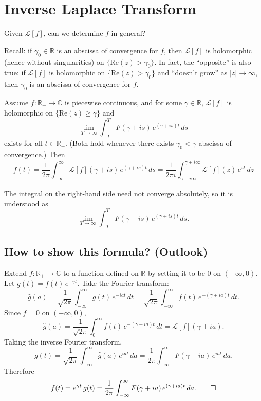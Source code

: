 
\newpage


\section{Inverse Laplace Transform}

Given $\mathcal{L}[f]$, can we determine $f$ in general?

Recall: if $\gamma_0 \in \mathbb{R}$ is an abscissa of convergence for $f$, then $\mathcal{L}[f]$ is holomorphic (hence without singularities) on $\{\mathrm{Re}(z) > \gamma_0\}$. In fact, the ``opposite'' is also true: if $\mathcal{L}[f]$ is holomorphic on $\{\mathrm{Re}(z) > \gamma_0\}$ and ``doesn't grow'' as $|z| \to \infty$, then $\gamma_0$ is an abscissa of convergence for $f$.

\begin{theorem}
Assume $f : \mathbb{R}_+ \to \mathbb{C}$ is piecewise continuous, and for some $\gamma \in \mathbb{R}$, $\mathcal{L}[f]$ is holomorphic on $\{\mathrm{Re}(z) \geq \gamma\}$ and
\[
\lim_{T \to \infty}\int_{-T}^{T} F(\gamma + is)\,e^{(\gamma + is)t}\,ds
\]
exists for all $t \in \mathbb{R}_+$. (Both hold whenever there exists $\gamma_0 < \gamma$ abscissa of convergence.) Then
\[
\boxed{f(t) = \frac{1}{2\pi}\int_{-\infty}^{\infty} \mathcal{L}[f](\gamma + is)\,e^{(\gamma + is)t}\,ds = 
\frac{1}{2\pi i}\int_{\gamma - i\infty}^{\gamma + i\infty} \mathcal{L}[f](z)\,e^{zt}\,dz}
\]
\end{theorem}

\begin{remark}
The integral on the right-hand side need not converge absolutely, so it is understood as
\[
\lim_{T \to \infty}\int_{-T}^{T} F(\gamma + is)\,e^{(\gamma + is)t}\,ds.
\]
\end{remark}

\subsection*{How to show this formula? (Outlook)}

Extend $f : \mathbb{R}_+ \to \mathbb{C}$ to a function defined on $\mathbb{R}$ by setting it to be $0$ on $(-\infty, 0)$. Let $g(t) = f(t)\,e^{-\gamma t}$. Take the Fourier transform:
\[
\hat{g}(a) = \frac{1}{\sqrt{2\pi}}\int_{-\infty}^{\infty} g(t)\,e^{-iat}\,dt
= \frac{1}{\sqrt{2\pi}}\int_{-\infty}^{\infty} f(t)\,e^{-(\gamma + ia)t}\,dt.
\]
Since $f = 0$ on $(-\infty, 0)$,
\[
\hat{g}(a) = \frac{1}{\sqrt{2\pi}}\int_0^{\infty} f(t)\,e^{-(\gamma + ia)t}\,dt = \mathcal{L}[f](\gamma + ia).
\]
Taking the inverse Fourier transform,
\[
g(t) = \frac{1}{\sqrt{2\pi}}\int_{-\infty}^{\infty} \hat{g}(a)\,e^{iat}\,da
= \frac{1}{2\pi}\int_{-\infty}^{\infty} F(\gamma + ia)\,e^{iat}\,da.
\]
Therefore
\[
f(t) = e^{\gamma t}\,g(t) = \frac{1}{2\pi}\int_{-\infty}^{\infty} F(\gamma + ia)\,e^{(\gamma + ia)t}\,da. \qedhere
\]

